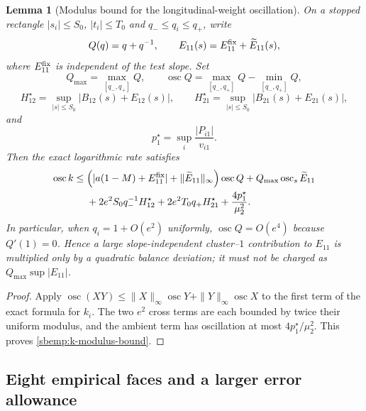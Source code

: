 \documentclass{article} %
\theoremstyle{plain}
\newtheorem{lemma}[theorem]{Lemma}
\theoremstyle{definition}
\theoremstyle{remark}
\begin{document}
\begin{lemma}[Modulus bound for the longitudinal-weight oscillation]
\label{sbemp:k-modulus}
On a stopped rectangle $|s_i|\le S_0$, $|t_i|\le T_0$ and
$q_-\le q_i\le q_+$, write
\[
 Q(q)=q+q^{-1},\qquad
 E_{11}(s)=E_{11}^{\rm fix}+\widetilde E_{11}(s),
\]
where $E_{11}^{\rm fix}$ is independent of the test slope.  Set
\[
 Q_{\max}=\max_{[q_-,q_+]}Q,\qquad
 \operatorname{osc}Q=\max_{[q_-,q_+]}Q-\min_{[q_-,q_+]}Q,
\]
\[
 H_{12}^\star=\sup_{|s|\le S_0}|B_{12}(s)+E_{12}(s)|,
 \qquad
 H_{21}^\star=\sup_{|s|\le S_0}|B_{21}(s)+E_{21}(s)|,
\]
and
\[
 p_1^\star=\sup_i\frac{|P_{i1}|}{v_{i1}}.
\]
Then the exact logarithmic rate satisfies
\begin{align}\label{sbemp:k-modulus-bound}
 \operatorname{osc}k
 \le{}&
 \Bigl(|a(1-M)+E_{11}^{\rm fix}|
       +\|\widetilde E_{11}\|_\infty\Bigr)\operatorname{osc}Q
 +Q_{\max}\operatorname{osc}_s\widetilde E_{11}\nonumber\\
 &+2e^2S_0q_-^{-1}H_{12}^\star
 +2e^2T_0q_+H_{21}^\star
 +\frac{4p_1^\star}{\mu_2^2}.
\end{align}
In particular, when $q_i=1+O(e^2)$ uniformly,
$\operatorname{osc}Q=O(e^4)$ because $Q'(1)=0$.  Hence a large
slope-independent cluster--$1$ contribution to $E_{11}$ is multiplied only
by a quadratic balance deviation; it must not be charged as
$Q_{\max}\sup|E_{11}|$.
\end{lemma}
\begin{proof}
Apply
$\operatorname{osc}(XY)\le\|X\|_\infty\operatorname{osc}Y
+\|Y\|_\infty\operatorname{osc}X$
to the first term of the exact formula for $k_i$.  The two $e^2$ cross
terms are each bounded by twice their uniform modulus, and the ambient term
has oscillation at most $4p_1^\star/\mu_2^2$.  This proves
\eqref{sbemp:k-modulus-bound}.
\end{proof}

\subsection{Eight empirical faces and a larger error allowance}
\end{document}
